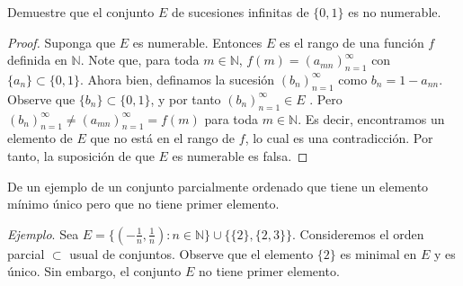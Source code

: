 \documentclass[12pt]{article}
\newcommand{\N}{\mathbb{N}}
\newenvironment{problem}[2][Problema]{\begin{trivlist}
\item[\hskip \labelsep {\bfseries #1}\hskip \labelsep {\bfseries #2.}]}{\end{trivlist}}
\begin{document}
\begin{problem}{23} Demuestre que el conjunto $E$ de sucesiones infinitas de $\{0, 1\}$ es no numerable.

\end{problem}
\begin{proof}
Suponga que $E$ es numerable. Entonces $E$ es el rango de una función $f$ definida en $\N$. Note que, para toda $m \in \N$, $f(m) = (a_{m n})_{n=1}^\infty$  con $\{a_n\} \subset \{0, 1\}$. Ahora bien, definamos la sucesión $(b_n)_{n=1}^\infty $ como $b_n = 1 - a_{nn}$. Observe que $\{b_n\} \subset \{0, 1\}$, y por tanto $(b_n)_{n=1}^\infty \in E$ . Pero $(b_n)_{n=1}^\infty \neq (a_{m n})_{n=1}^\infty = f(m)$ para toda $m \in \N$. Es decir, encontramos un elemento de $E$ que no está en el rango de $f$, lo cual es una contradicción. Por tanto, la suposición de que $E$ es numerable es falsa.  
\end{proof}
\text{ }
\begin{problem}{29} De un ejemplo de un conjunto parcialmente ordenado que tiene un elemento mínimo único pero que no tiene primer elemento.

\end{problem}
\noindent
\textit{Ejemplo}. Sea $E = \{(-\frac{1}{n}, \frac{1}{n}): n \in \N \}  \cup \{ \{2\} , \{2, 3\}\}$. Consideremos el orden parcial $\subset$ usual de conjuntos. Observe que el elemento $\{2\}$ es minimal en $E$ y es único. Sin embargo, el conjunto $E$ no tiene primer elemento.  
\end{document}
